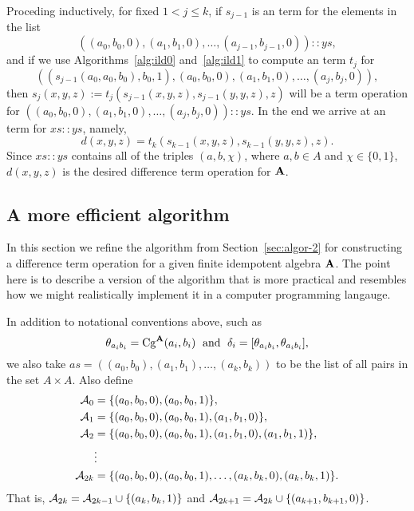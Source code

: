 Proceding inductively, for fixed $1<j\leq k$, 
if $s_{j-1}$ is an \ld term 
for the elements in the list
\begin{equation*}
((a_0, b_0, 0), (a_1, b_1, 0), \dots, (a_{j-1}, b_{j-1}, 0)) :: ys,
\end{equation*}
and if we use Algorithms~\ref{alg:ild0} and~\ref{alg:ild1}
to compute an \ld term $t_j$ for
\begin{equation*}
((s_{j-1}(a_0, a_0, b_0), b_0, 1), (a_0, b_0, 0),(a_1, b_1, 0),\dots, 
(a_j, b_j, 0)), 
\end{equation*}
then $s_j(x,y,z) := t_j(s_{j-1}(x,y,z), s_{j-1}(y,y,z), z)$ will be a 
\ld term operation for 
$((a_0, b_0, 0), (a_1, b_1, 0), \dots, (a_j, b_j, 0)) :: ys$.
In the end we arrive at an \ld term for $xs :: ys$, namely,
\begin{equation*}
d(x,y,z) = t_k(s_{k-1}(x,y,z), s_{k-1}(y,y,z), z).
\end{equation*}
Since $xs :: ys$ contains all of the triples $(a,b,\chi)$, where
$a, b \in A$ and $\chi \in \{0,1\}$, 
$d(x,y,z)$ is the desired difference term operation for $\mathbf{A}$.



\subsection{A more efficient algorithm}
\label{sec:algor-3}
In this section we refine the algorithm from Section~\ref{sec:algor-2}
for constructing a difference term operation for a given finite idempotent 
algebra $\mathbf{A}$.  
The point here is to describe a version of the algorithm that is more practical
and resembles how we might realistically implement it in a computer 
programming langauge.

In addition to notational conventions above, such as
\begin{equation}
\label{eqn:notation1}
\theta_{a_ib_i} = \operatorname{Cg}^{\mathbf{A}}(a_i, b_i) \; \text{ and } \;
\delta_i=[\theta_{a_ib_i}, \theta_{a_ib_i}],
\end{equation}
we also take
$as = ((a_0, b_0), (a_1, b_1), \dots, (a_k, b_k))$ 
to be the list of all pairs in the set $A\times A$.
Also define
\begin{align*}
\mathcal{A}_0 &= \{(a_0, b_0, 0), (a_0, b_0, 1)\},\\
\mathcal{A}_1 &= \{(a_0, b_0, 0), (a_0, b_0, 1), (a_1,b_1,0)\},\\
\mathcal{A}_2 &= \{(a_0, b_0, 0), (a_0, b_0, 1), (a_1,b_1,0), (a_1,b_1,1)\},\\
&\vdots\\
\mathcal{A}_{2k} &= \{(a_0, b_0, 0), (a_0, b_0, 1), \dots, (a_k,b_k,0), (a_k,b_k,1)\}.
\end{align*}
That is, 
$\mathcal{A}_{2k} = \mathcal{A}_{2k-1} \cup \{(a_k,b_k,1)\}$ and
$\mathcal{A}_{2k+1} = \mathcal{A}_{2k} \cup \{(a_{k+1},b_{k+1},0)\}$.

